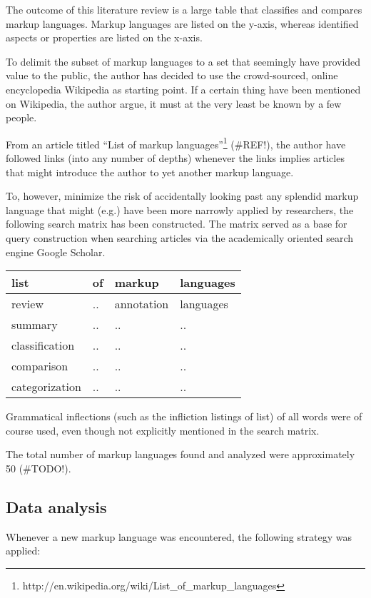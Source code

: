\documentclass{scrreprt}
\begin{document}
The outcome of this literature review is a large table that classifies and compares markup languages. Markup languages are listed on the y-axis, whereas identified aspects or properties are listed on the x-axis.

To delimit the subset of markup languages to a set that seemingly have provided value to the public, the author has decided to use the crowd-sourced, online encyclopedia Wikipedia as starting point. If a certain thing have been mentioned on Wikipedia, the author argue, it must at the very least be known by a few people.

From an article titled ``List of markup languages''\footnote{http://en.wikipedia.org/wiki/List\_of\_markup\_languages} (\#REF!), the author have followed links (into any number of depths) whenever the links implies articles that might introduce the author to yet another markup language.

To, however, minimize the risk of accidentally looking past any splendid markup language that might (e.g.) have been more narrowly applied by researchers, the following search matrix has been constructed. The matrix served as a base for query construction when searching articles via the academically oriented search engine Google Scholar.

\vspace{6pt}
\begin{tabular}{ |l|l|l|l| }
  \hline
  list            & of & markup     & languages \\\hline
  review          & ..   & annotation & languages \\\hline
  summary         & ..   & .. & .. \\\hline
  classification  & ..   & .. & .. \\\hline
  comparison      & ..   & .. & .. \\\hline
  categorization  & ..   & .. & .. \\\hline
\end{tabular}
\vspace{6pt}

Grammatical inflections (such as the infliction listings of list) of all words were of course used, even though not explicitly mentioned in the search matrix.

The total number of markup languages found and analyzed were approximately 50 (\#TODO!).


\subsection{Data analysis}
Whenever a new markup language was encountered, the following strategy was applied:
\end{document}
